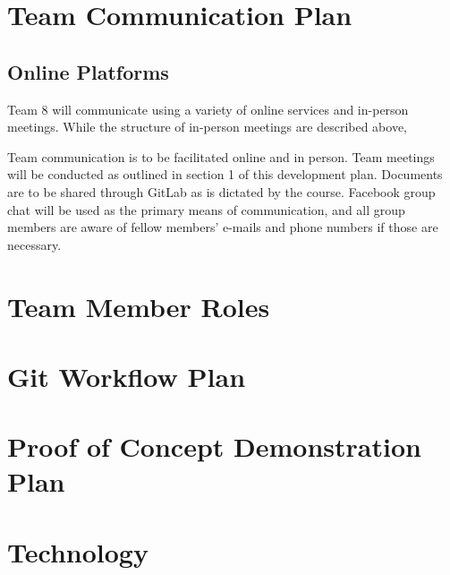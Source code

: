 \documentclass{article}
\begin{document}

\section{Team Communication Plan}
\subsection{Online Platforms}
Team 8 will communicate using a variety of online services and in-person meetings. While the structure of in-person meetings are described above, 


Team communication is to be facilitated online and in person. Team meetings will 
be conducted as outlined in section 1 of this development plan. Documents are to 
be shared through GitLab as is dictated by the course. Facebook group chat will 
be used as the primary means of communication, and all group members are aware 
of fellow members’ e-mails and phone numbers if those are necessary.

\section{Team Member Roles}

\section{Git Workflow Plan}

\section{Proof of Concept Demonstration Plan}

\section{Technology}
\end{document}
